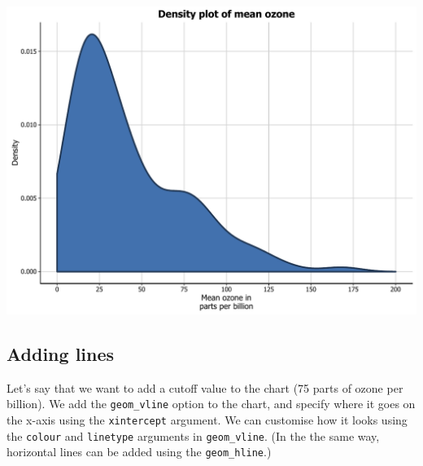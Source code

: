 \documentclass[]{article}
\newenvironment{Shaded}{\begin{snugshade}}{\end{snugshade}}
\newcommand{\KeywordTok}[1]{\textcolor[rgb]{0.13,0.29,0.53}{\textbf{{#1}}}}
\newcommand{\DataTypeTok}[1]{\textcolor[rgb]{0.13,0.29,0.53}{{#1}}}
\newcommand{\DecValTok}[1]{\textcolor[rgb]{0.00,0.00,0.81}{{#1}}}
\newcommand{\StringTok}[1]{\textcolor[rgb]{0.31,0.60,0.02}{{#1}}}
\newcommand{\NormalTok}[1]{{#1}}
\begin{document}
\begin{center}\includegraphics{0_all_posts_pdf/density_12-1} \end{center}

\subsection{Adding lines}\label{adding-lines-1}

Let's say that we want to add a cutoff value to the chart (75 parts of
ozone per billion). We add the \texttt{geom\_vline} option to the chart,
and specify where it goes on the x-axis using the \texttt{xintercept}
argument. We can customise how it looks using the \texttt{colour} and
\texttt{linetype} arguments in \texttt{geom\_vline}. (In the the same
way, horizontal lines can be added using the \texttt{geom\_hline}.)

\begin{Shaded}
\end{Shaded}
\end{document}
